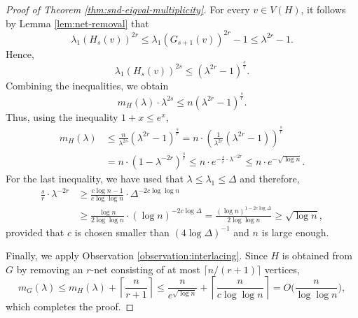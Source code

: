 \begin{proof}[Proof of Theorem \ref{thm:snd-eigval-multiplicity}]
    For every $v \in V(H)$, it follows by Lemma \ref{lem:net-removal} that 
    \begin{equation*}
        \lambda_1 (H_s (v))^{2r} \le \lambda_1 (G_{s + 1}(v)) ^{2r} - 1 \le \lambda^{2r} - 1.
    \end{equation*}
    Hence,
    \begin{equation*}
        \lambda_1 (H_s (v))^{2s} \le (\lambda^{2r} - 1)^{\frac{s}{r}}.
    \end{equation*}
    Combining the inequalities, we obtain
    \begin{equation*}
        m_H (\lambda) \cdot \lambda^{2s} \le n (\lambda^{2r} - 1)^{\frac{s}{r}}.
    \end{equation*}
    Thus, using the inequality $1 + x \le e^x$, 
    \begin{align*}
        m_H (\lambda) &\le \frac{n}{\lambda^{2s}} (\lambda^{2r} - 1)^{\frac{s}{r}} 
            = n \cdot \left ( \frac{1}{\lambda^{2r}} ( \lambda^{2r} - 1) \right) ^{\frac{s}{r}} \\ 
        &= n \cdot (1 - \lambda^{-2r})^{\frac{s}{r}} 
            \le n \cdot e ^{-\frac{s}{r} \cdot \lambda^{-2r}} 
            \le n \cdot e^{-\sqrt{\log n}}.
    \end{align*}
    For the last inequality, we have used that $\lambda \le \lambda_1 \le \Delta$ and therefore,
    \begin{align*}
        \frac{s}{r} \cdot \lambda^{-2r} &\ge \frac{c \log n - 1}{c \log \log n} \cdot \Delta^{-2 c \log \log n} \\ 
        &\ge \frac{\log n}{2 \log \log n} \cdot (\log n)^{-2 c \log \Delta} = \frac{(\log n)^{1 - 2c \log \Delta}}{2 \log \log n} \ge \sqrt{\log n},
    \end{align*}
    provided that $c$ is chosen smaller than $(4 \log \Delta)^{-1}$ and $n$ is large enough.

    Finally, we apply Observation \ref{observation:interlacing}. 
    Since $H$ is obtained from $G$ by removing an $r$-net consisting of at most $\lceil n / (r + 1) \rceil$ vertices, 
    \begin{equation*}
        m_G(\lambda) \le m_H(\lambda) + \left \lceil \frac{n}{r + 1} \right \rceil \le \frac{n}{e^{\sqrt{\log n}}} + \left \lceil \frac{n}{c \log \log n} \right \rceil
            = O \Big(\frac{n}{\log \log n} \Big),
    \end{equation*}
    which completes the proof.
\end{proof}

